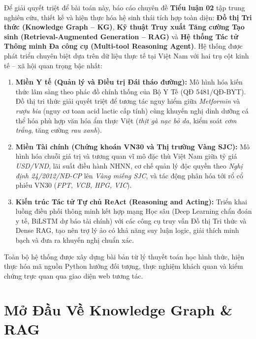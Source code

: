 \documentclass[12pt,a4paper]{report}
\begin{document}
Để giải quyết triệt để bài toán này, báo cáo chuyên đề \textbf{Tiểu luận 02} tập trung nghiên cứu, thiết kế và hiện thực hóa hệ sinh thái tích hợp toàn diện: \textbf{Đồ thị Tri thức (Knowledge Graph -- KG)}, \textbf{Kỹ thuật Truy xuất Tăng cường Tạo sinh (Retrieval-Augmented Generation -- RAG)} và \textbf{Hệ thống Tác tử Thông minh Đa công cụ (Multi-tool Reasoning Agent)}. Hệ thống được phát triển chuyên biệt dựa trên dữ liệu thực tế tại Việt Nam với hai trụ cột kinh tế -- xã hội quan trọng bậc nhất:
\begin{enumerate}[itemsep=0pt, parsep=0pt, topsep=1pt]
    \item \textbf{Miền Y tế (Quản lý và Điều trị Đái tháo đường):} Mô hình hóa kiến thức lâm sàng theo phác đồ chính thống của Bộ Y Tế (QĐ 5481/QĐ-BYT). Đồ thị tri thức giải quyết triệt để tương tác nguy hiểm giữa \textit{Metformin} và \textit{rượu bia} (nguy cơ toan acid lactic cấp tính) cùng khuyến nghị dinh dưỡng cá thể hóa phù hợp văn hóa ẩm thực Việt (\textit{thịt gà nạc bỏ da}, kiểm soát \textit{cơm trắng}, tăng cường \textit{rau xanh}).
    \item \textbf{Miền Tài chính (Chứng khoán VN30 và Thị trường Vàng SJC):} Mô hình hóa chuỗi giá trị và tương quan vĩ mô đặc thù Việt Nam giữa tỷ giá \textit{USD/VND}, lãi suất điều hành NHNN, cơ chế quản lý độc quyền theo \textit{Nghị định 24/2012/NĐ-CP} lên \textit{Vàng miếng SJC}, và tác động phân hóa tới rổ cổ phiếu VN30 (\textit{FPT, VCB, HPG, VIC}).
    \item \textbf{Kiến trúc Tác tử Tự chủ ReAct (Reasoning and Acting):} Triển khai luồng điều phối thông minh kết hợp mạng Học sâu (Deep Learning chẩn đoán y tế, BiLSTM dự báo tài chính) với các công cụ truy vấn Đồ thị Tri thức và Dense RAG, tạo nên trợ lý ảo có khả năng suy luận logic, giải thích minh bạch và đưa ra khuyến nghị chuẩn xác.
\end{enumerate}

Toàn bộ hệ thống được xây dựng bài bản từ lý thuyết toán học hình thức, hiện thực hóa mã nguồn Python hướng đối tượng, thực nghiệm khách quan và kiểm chứng trực quan qua giao diện web tương tác.

\newpage

\chapter{Mở Đầu Về Knowledge Graph \& RAG}
\end{document}
